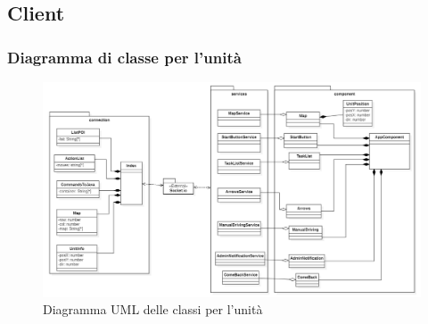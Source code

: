 \subsection{Client}
\subsubsection{Diagramma di classe per l'unità}

\begin{figure}[H]
	\centering
	\includegraphics[scale=0.5]{res/images/UML_operatore.png}
	\caption{Diagramma UML delle classi per l'unità}
\end{figure}

